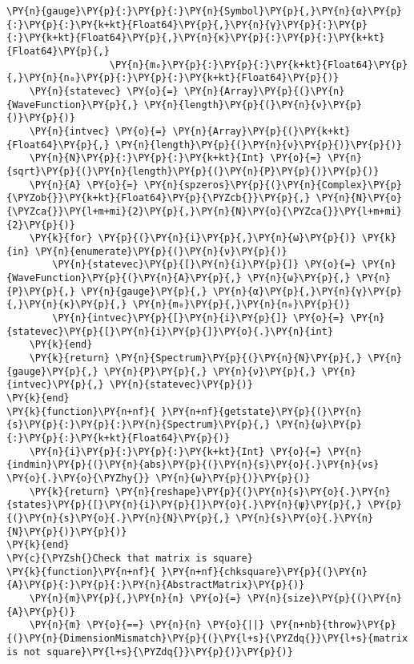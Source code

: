\begin{Verbatim}[commandchars=\\\{\}]
                  \PY{n}{gauge}\PY{p}{:}\PY{p}{:}\PY{n}{Symbol}\PY{p}{,}\PY{n}{α}\PY{p}{:}\PY{p}{:}\PY{k+kt}{Float64}\PY{p}{,}\PY{n}{γ}\PY{p}{:}\PY{p}{:}\PY{k+kt}{Float64}\PY{p}{,}\PY{n}{κ}\PY{p}{:}\PY{p}{:}\PY{k+kt}{Float64}\PY{p}{,}
                  \PY{n}{m₀}\PY{p}{:}\PY{p}{:}\PY{k+kt}{Float64}\PY{p}{,}\PY{n}{n₀}\PY{p}{:}\PY{p}{:}\PY{k+kt}{Float64}\PY{p}{)}
    \PY{n}{statevec} \PY{o}{=} \PY{n}{Array}\PY{p}{(}\PY{n}{WaveFunction}\PY{p}{,} \PY{n}{length}\PY{p}{(}\PY{n}{ν}\PY{p}{)}\PY{p}{)}
    \PY{n}{intvec} \PY{o}{=} \PY{n}{Array}\PY{p}{(}\PY{k+kt}{Float64}\PY{p}{,} \PY{n}{length}\PY{p}{(}\PY{n}{ν}\PY{p}{)}\PY{p}{)}
    \PY{n}{N}\PY{p}{:}\PY{p}{:}\PY{k+kt}{Int} \PY{o}{=} \PY{n}{sqrt}\PY{p}{(}\PY{n}{length}\PY{p}{(}\PY{n}{P}\PY{p}{)}\PY{p}{)}
    \PY{n}{A} \PY{o}{=} \PY{n}{spzeros}\PY{p}{(}\PY{n}{Complex}\PY{p}{\PYZob{}}\PY{k+kt}{Float64}\PY{p}{\PYZcb{}}\PY{p}{,} \PY{n}{N}\PY{o}{\PYZca{}}\PY{l+m+mi}{2}\PY{p}{,}\PY{n}{N}\PY{o}{\PYZca{}}\PY{l+m+mi}{2}\PY{p}{)}
    \PY{k}{for} \PY{p}{(}\PY{n}{i}\PY{p}{,}\PY{n}{ω}\PY{p}{)} \PY{k}{in} \PY{n}{enumerate}\PY{p}{(}\PY{n}{ν}\PY{p}{)}
        \PY{n}{statevec}\PY{p}{[}\PY{n}{i}\PY{p}{]} \PY{o}{=} \PY{n}{WaveFunction}\PY{p}{(}\PY{n}{A}\PY{p}{,} \PY{n}{ω}\PY{p}{,} \PY{n}{P}\PY{p}{,} \PY{n}{gauge}\PY{p}{,} \PY{n}{α}\PY{p}{,}\PY{n}{γ}\PY{p}{,}\PY{n}{κ}\PY{p}{,} \PY{n}{m₀}\PY{p}{,}\PY{n}{n₀}\PY{p}{)}
        \PY{n}{intvec}\PY{p}{[}\PY{n}{i}\PY{p}{]} \PY{o}{=} \PY{n}{statevec}\PY{p}{[}\PY{n}{i}\PY{p}{]}\PY{o}{.}\PY{n}{int}
    \PY{k}{end}
    \PY{k}{return} \PY{n}{Spectrum}\PY{p}{(}\PY{n}{N}\PY{p}{,} \PY{n}{gauge}\PY{p}{,} \PY{n}{P}\PY{p}{,} \PY{n}{ν}\PY{p}{,} \PY{n}{intvec}\PY{p}{,} \PY{n}{statevec}\PY{p}{)}
\PY{k}{end}
\PY{k}{function}\PY{n+nf}{ }\PY{n+nf}{getstate}\PY{p}{(}\PY{n}{s}\PY{p}{:}\PY{p}{:}\PY{n}{Spectrum}\PY{p}{,} \PY{n}{ω}\PY{p}{:}\PY{p}{:}\PY{k+kt}{Float64}\PY{p}{)}
    \PY{n}{i}\PY{p}{:}\PY{p}{:}\PY{k+kt}{Int} \PY{o}{=} \PY{n}{indmin}\PY{p}{(}\PY{n}{abs}\PY{p}{(}\PY{n}{s}\PY{o}{.}\PY{n}{νs} \PY{o}{.}\PY{o}{\PYZhy{}} \PY{n}{ω}\PY{p}{)}\PY{p}{)}
    \PY{k}{return} \PY{n}{reshape}\PY{p}{(}\PY{n}{s}\PY{o}{.}\PY{n}{states}\PY{p}{[}\PY{n}{i}\PY{p}{]}\PY{o}{.}\PY{n}{ψ}\PY{p}{,} \PY{p}{(}\PY{n}{s}\PY{o}{.}\PY{n}{N}\PY{p}{,} \PY{n}{s}\PY{o}{.}\PY{n}{N}\PY{p}{)}\PY{p}{)}
\PY{k}{end}
\PY{c}{\PYZsh{}Check that matrix is square}
\PY{k}{function}\PY{n+nf}{ }\PY{n+nf}{chksquare}\PY{p}{(}\PY{n}{A}\PY{p}{:}\PY{p}{:}\PY{n}{AbstractMatrix}\PY{p}{)}
    \PY{n}{m}\PY{p}{,}\PY{n}{n} \PY{o}{=} \PY{n}{size}\PY{p}{(}\PY{n}{A}\PY{p}{)}
    \PY{n}{m} \PY{o}{==} \PY{n}{n} \PY{o}{||} \PY{n+nb}{throw}\PY{p}{(}\PY{n}{DimensionMismatch}\PY{p}{(}\PY{l+s}{\PYZdq{}}\PY{l+s}{matrix is not square}\PY{l+s}{\PYZdq{}}\PY{p}{)}\PY{p}{)}

\end{Verbatim}
